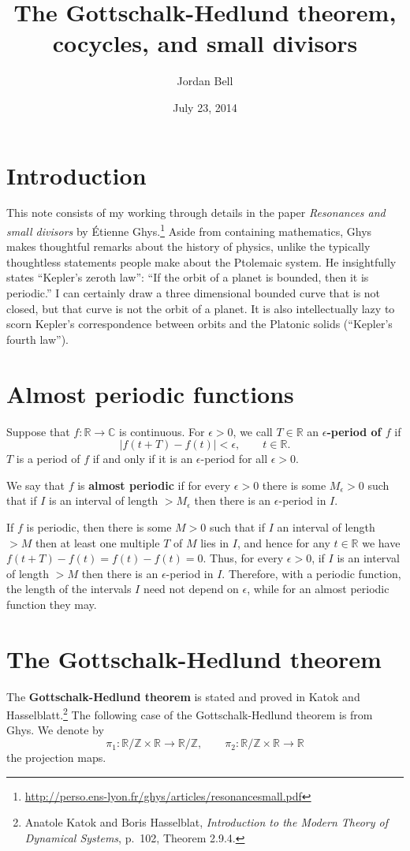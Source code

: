 \documentclass{article}
\theoremstyle{definition}
\begin{document}
\title{The Gottschalk-Hedlund theorem, cocycles, and small divisors}
\author{Jordan Bell}
\date{July 23, 2014}

\maketitle

\section{Introduction}
This note consists of my working through details in the paper {\em Resonances and small divisors} by \'Etienne Ghys.\footnote{\url{http://perso.ens-lyon.fr/ghys/articles/resonancesmall.pdf}} Aside from containing mathematics, Ghys makes thoughtful remarks about the history of physics, unlike the typically thoughtless statements 
people make about the Ptolemaic system. He insightfully states ``Kepler's zeroth law'': ``If the orbit of a planet is bounded, then it is
periodic.'' I can certainly draw a three dimensional bounded curve that is not closed, but that curve is not the orbit of a planet. It is also intellectually lazy to scorn Kepler's correspondence between
orbits and the Platonic solids (``Kepler's fourth law'').

\section{Almost periodic functions}
Suppose that $f:\mathbb{R} \to \mathbb{C}$ is continuous. For $\epsilon>0$, we call $T \in \mathbb{R}$ an \textbf{$\epsilon$-period of $f$} if 
\[
|f(t+T)-f(t)|<\epsilon, \qquad t \in \mathbb{R}.
\]
$T$ is a period of $f$ if and only if it is an $\epsilon$-period for all $\epsilon>0$.

We say that $f$ is \textbf{almost periodic} if for every $\epsilon>0$ there is some $M_\epsilon>0$ such that if $I$ is an interval 
of length $>M_\epsilon$ then there is an $\epsilon$-period in $I$.

If $f$ is periodic, then there is some $M>0$ such that if $I$ an interval of length $>M$ then at least one multiple $T$ of $M$ lies in $I$, and hence
for any $t \in \mathbb{R}$ we have $f(t+T) - f(t)=f(t)-f(t)=0$. Thus, for every $\epsilon>0$, if $I$ is an interval of length $>M$ then there is an
$\epsilon$-period in $I$. Therefore, with a periodic function, the length of the intervals $I$ need not depend on $\epsilon$, while for an almost
periodic function they may.


\section{The Gottschalk-Hedlund theorem}
The \textbf{Gottschalk-Hedlund theorem} is stated and proved in Katok and Hasselblatt.\footnote{Anatole Katok and Boris Hasselblat, {\em Introduction to the Modern Theory of Dynamical Systems},
p.~102, Theorem 2.9.4.} The following case of the Gottschalk-Hedlund theorem is from Ghys. We denote by
\[
\pi_1:\mathbb{R}/\mathbb{Z} \times \mathbb{R} \to 
\mathbb{R} / \mathbb{Z}, \qquad \pi_2:\mathbb{R}/\mathbb{Z} \times \mathbb{R} \to 
\mathbb{R} 
\]
 the projection maps. 
\end{document}

